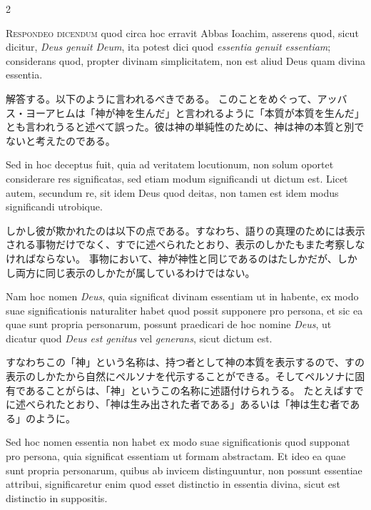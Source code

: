 \documentclass[paper=a4paper,fontsize=10pt,jafontsize=9pt,titlepage]{jlreq}
\begin{document}
\begin{paracol}{2}
\switchcolumn*

\textsc{Respondeo dicendum} quod circa hoc erravit Abbas Ioachim, asserens quod, sicut
dicitur, \textit{Deus genuit Deum}, ita potest dici quod \textit{essentia genuit essentiam};
considerans quod, propter divinam simplicitatem, non est aliud Deus quam divina
essentia.

\switchcolumn

解答する。以下のように言われるべきである。
このことをめぐって、アッバス・ヨーアヒムは「神が神を生んだ」と言われるように「本質が本質を生んだ」とも言われうると述べて誤った。彼は神の単純性のために、神は神の本質と別でないと考えたのである。

\switchcolumn*

Sed in hoc deceptus fuit, quia ad veritatem locutionum, non solum
oportet considerare res significatas, sed etiam modum significandi ut dictum
est. Licet autem, secundum re, sit idem Deus quod deitas, non tamen est idem
modus significandi utrobique.

\switchcolumn

しかし彼が欺かれたのは以下の点である。すなわち、語りの真理のためには表示される事物だけでなく、すでに述べられたとおり、表示のしかたもまた考察しなければならない。
事物において、神が神性と同じであるのはたしかだが、しかし両方に同じ表示のしかたが属しているわけではない。

\switchcolumn*

Nam hoc nomen \textit{Deus}, quia significat divinam
essentiam ut in habente, ex modo suae significationis naturaliter habet quod
possit supponere pro persona, et sic ea quae sunt propria personarum, possunt
praedicari de hoc nomine \textit{Deus}, ut dicatur quod \textit{Deus est genitus} vel \textit{generans},
sicut dictum est.

\switchcolumn

すなわちこの「神」という名称は、持つ者として神の本質を表示するので、すの表示のしかたから自然にペルソナを代示することができる。そしてペルソナに固有であることがらは、「神」というこの名称に述語付けられうる。
たとえばすでに述べられたとおり、「神は生み出された者である」あるいは「神は生む者である」のように。

\switchcolumn*

Sed hoc nomen essentia non habet ex modo suae significationis
quod supponat pro persona, quia significat essentiam ut formam abstractam. Et
ideo ea quae sunt propria personarum, quibus ab invicem distinguuntur, non
possunt essentiae attribui, significaretur enim quod esset distinctio in
essentia divina, sicut est distinctio in suppositis.


\end{paracol}
\end{document}
